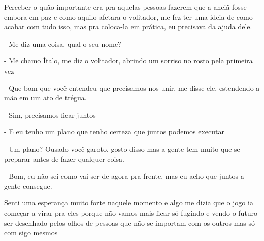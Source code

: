 Perceber o quão importante era pra aquelas pessoas fazerem que a anciã fosse embora em paz e como aquilo afetara o volitador, me fez ter uma ideia de como acabar com tudo isso, mas pra coloca-la em prática, eu precisava da ajuda dele.

- Me diz uma coisa, qual o seu nome?

- Me chamo Ítalo, me diz o volitador, abrindo um sorriso no rosto pela primeira vez

- Que bom que você entendeu que precisamos nos unir, me disse ele, estendendo a mão em um ato de trégua.

- Sim, precisamos ficar juntos

- E eu tenho um plano que tenho certeza que juntos podemos executar

- Um plano? Ousado você garoto, gosto disso mas a gente tem muito que se preparar antes de fazer qualquer coisa.

- Bom, eu não sei como vai ser  de agora pra frente, mas eu acho que juntos a gente consegue.

Senti uma esperança muito forte naquele momento e algo me dizia que o jogo ia começar a virar pra eles porque não vamos mais ficar só fugindo e vendo o futuro ser desenhado pelos olhos de pessoas que não se importam com os outros mas só com sigo mesmos


